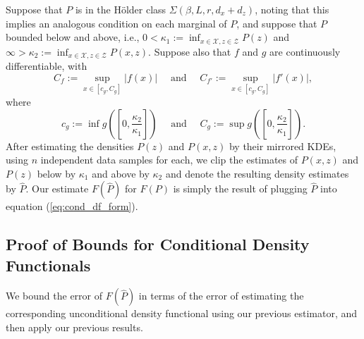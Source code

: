 \documentclass{article} %
\newcommand{\X}{\mathcal{X}}                        %
\newcommand{\Z}{\mathcal{Z}}                        %
\begin{document}
Suppose that $P$ is in the H\"older class $\Sigma(\beta,L,r,d_x + d_z)$, noting
that this implies an analogous condition on each marginal of $P$, and suppose
that $P$ bounded below and above, i.e.,
$0 < \kappa_1 := \inf_{x \in \X,z \in \Z} P(z)$ and
$\infty > \kappa_2 := \inf_{x \in \X,z \in \Z} P(x,z)$. Suppose also that $f$
and $g$ are continuously differentiable, with
\begin{equation}
C_f := \sup_{x \in [c_g,C_g]} |f(x)|
    \quad \mbox{ and } \quad
    C_{f'} := \sup_{x \in [c_g,C_g]} |f'(x)|,
\label{ineq:f_bounds}
\end{equation}
where
\[c_g := \inf g\left(\left[0, \frac{\kappa_2}{\kappa_1}\right]\right)
    \quad \mbox{ and } \quad
    C_g := \sup g\left(\left[0, \frac{\kappa_2}{\kappa_1}\right]\right).
\]
After estimating the densities $P(z)$ and $P(x,z)$ by their mirrored KDEs,
using $n$ independent data samples for each, we clip the estimates of $P(x,z)$
and $P(z)$ below by $\kappa_1$ and above by $\kappa_2$ and denote the resulting
density estimates by $\hat P$. Our estimate $F(\hat P)$ for $F(P)$ is simply
the result of plugging $\hat P$ into equation (\ref{eq:cond_df_form}).

\subsection{Proof of Bounds for Conditional Density Functionals}
We bound the error of $F(\hat P)$ in terms of the error of estimating the
corresponding unconditional density functional using our previous estimator,
and then apply our previous results.
\end{document}
